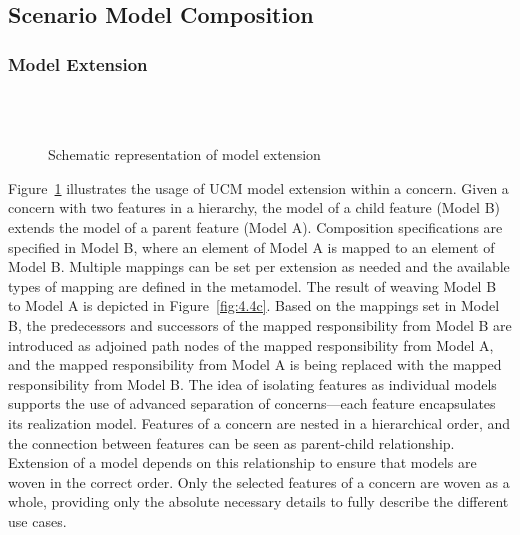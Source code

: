 \subsection{Scenario Model Composition}

\subsubsection{Model Extension}

\begin{figure}
	\centering
	 \\
	 \\
	\caption{Schematic representation of model extension}
	\label{fig:4.4}
\end{figure}

Figure~\ref{fig:4.4} illustrates the usage of UCM model extension within a concern. Given a concern with two features in a hierarchy, the model of a child feature (Model B) extends the model of a parent feature (Model A). Composition specifications are specified in Model B, where an element of Model A is mapped to an element of Model B. Multiple mappings can be set per extension as needed and the available types of mapping are defined in the metamodel. The result of weaving Model B to Model A is depicted in Figure~\ref{fig:4.4c}. Based on the mappings set in Model B, the predecessors and successors of the mapped responsibility from Model B are introduced as adjoined path nodes of the mapped responsibility from Model A, and the mapped responsibility from Model A is being replaced with the mapped responsibility from Model B.
The idea of isolating features as individual models supports the use of advanced separation of concerns---each feature encapsulates its realization model. Features of a concern are nested in a hierarchical order, and the connection between features can be seen as parent-child relationship. Extension of a model depends on this relationship to ensure that models are woven in the correct order. Only the selected features of a concern are woven as a whole, providing only the absolute necessary details to fully describe the different use cases.

